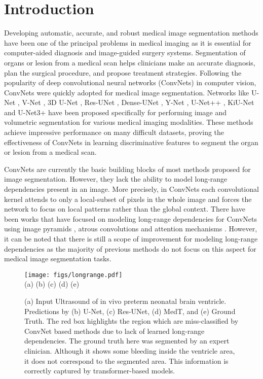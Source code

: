 \documentclass[runningheads]{llncs}
\begin{document}
	\section{Introduction}
	 
		Developing automatic, accurate, and robust medical image segmentation methods have been one of the principal problems in medical imaging as it is essential for computer-aided diagnosis and image-guided surgery systems. Segmentation of organs or lesion from a medical scan helps clinicians make an accurate diagnosis, plan the surgical procedure, and propose treatment strategies. Following the popularity of deep convolutional neural networks (ConvNets) in computer vision, ConvNets were quickly adopted for medical image segmentation. Networks like U-Net \cite{ronneberger2015u}, V-Net \cite{milletari2016v}, 3D U-Net \cite{cciccek20163d}, Res-UNet \cite{xiao2018weighted}, Dense-UNet \cite{li2018h}, Y-Net \cite{mehta2018net}, U-Net++ \cite{zhou2018unet++}, KiU-Net \cite{valanarasu2020kiu,valanarasu2020kiu1} and U-Net3+ \cite{huang2020unet} have been proposed specifically for performing image and volumetric segmentation for various medical imaging modalities. These methods achieve impressive performance on many difficult datasets, proving the effectiveness of ConvNets in learning discriminative features to segment the organ or lesion from a medical scan.
	 
		ConvNets are currently the basic building blocks of most methods proposed for image segmentation. However, they lack the ability to model long-range dependencies present in an image. More precisely, in ConvNets each convolutional kernel attends to only a local-subset of pixels in the whole image and forces the network to focus on local patterns rather than the global context. There have been works that have focused on modeling long-range dependencies for ConvNets using image pyramids \cite{zhao2017pyramid}, atrous convolutions \cite{chen2014semantic} and attention mechanisms \cite{huang2019ccnet}. However, it can be noted that there is still a scope of improvement for modeling long-range dependencies as the majority of previous methods do not focus on this aspect for medical image segmentation tasks.
	 
	 
	 \begin{figure}[htbp]
	 	\vskip -20pt
	 	\centering
	 	\texttt{[image: figs/longrange.pdf]}\\
	 	(a) \hskip35pt (b) \hskip35pt (c) \hskip35pt (d) \hskip35pt (e) \hskip35pt 
	 	\vskip -10.0pt
	 	\caption{(a) Input Ultrasound of in vivo preterm neonatal brain ventricle. Predictions by (b) U-Net, (c) Res-UNet, (d) MedT, and (e) Ground Truth. The red box highlights the region which are miss-classified by ConvNet based methods due to lack of learned long-range dependencies. The ground truth here was segmented by an expert clinician. Although it shows some bleeding inside the ventricle area, it does not correspond to the segmented area. This information is correctly captured by transformer-based models. }
	 	\label{explana}
	 \end{figure}
	 
\end{document}
